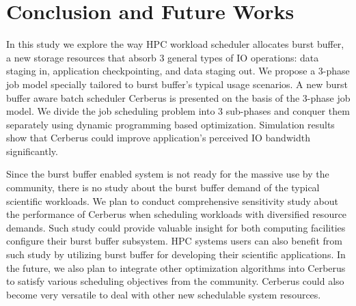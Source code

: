 \section{Conclusion and Future Works}
\label{Sec:Conclusion}

In this study we explore the way HPC workload scheduler allocates burst buffer,
a new storage resources that absorb 3 general types of IO operations:
data staging in, application checkpointing, and data staging out.
We propose a 3-phase job model specially
tailored to burst buffer's typical usage scenarios.
A new burst buffer aware batch scheduler Cerberus is presented
on the basis of the 3-phase job model.
We divide the job scheduling problem into 3 sub-phases
and conquer them separately using dynamic programming based optimization.
Simulation results show that
Cerberus could improve application's perceived IO bandwidth significantly.


Since the burst buffer enabled system is not ready for the massive 
use by the community, 
there is no study about the burst buffer demand of the typical scientific workloads.
We plan to conduct comprehensive sensitivity study about the performance of Cerberus
when scheduling workloads with diversified resource demands. Such study could provide
valuable insight for both computing facilities configure their burst buffer subsystem.
HPC systems users can also benefit from such study by utilizing burst buffer for developing
their scientific applications.
In the future, we also plan to integrate other optimization algorithms into Cerberus
to satisfy various scheduling objectives from the community. 
Cerberus could also become very versatile 
to deal with other new schedulable system resources.

